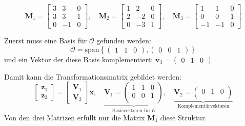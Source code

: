 \documentclass[crop=false]{standalone}
\begin{document}
\begin{task}
\begin{enumerate}[i]
\[\mathbf{M}_{1}=\left[\begin{array}{ccc}{3} & {3} & {0} \\ {3} & {3} & {1} \\ {0} & {-1} & {0}\end{array}\right], \quad \mathbf{M}_{2}=\left[\begin{array}{ccc}{1} & {2} & {0} \\ {2} & {-2} & {0} \\ {0} & {-3} & {1}\end{array}\right], \quad \mathbf{M}_{3}=\left[\begin{array}{ccc}{1} & {1} & {0} \\ {0} & {0} & {1} \\ {-1} & {-1} & {0}\end{array}\right]
 \]
 \begin{solution}
 Zuerst muss eine Basis für $\mathcal{O}$ gefunden werden:
 \[ \mathcal{O} = \text{span}\left\{ 
 \begin{pmatrix} 1 & 1 & 0 \end{pmatrix},
 \begin{pmatrix} 0 & 0 & 1 \end{pmatrix}
 \right\} \]
 und ein Vektor der diese Basis komplementiert: $\mathbf{v}_3 = \begin{pmatrix} 0 & 1 & 0 \end{pmatrix}$
 
 
 Damit kann die Transformationsmatrix gebildet werden:
 \[ 
\left[\begin{array}{l}{\mathbf{z}_{1}} \\ {\mathbf{z}_{2}}\end{array}\right]=\left[\begin{array}{c}{\mathbf{V}_{1}} \\ {\mathbf{V}_{2}}\end{array}\right] \mathbf{x}, \quad 
\underbrace{
\mathbf{V}_{1} = 
\begin{pmatrix}
1&1&0\\
0&0&1\\
\end{pmatrix}}_{\text{Basisvektoren für }\mathcal{O}}, \quad
\underbrace{
\mathbf{V}_{2} = 
\begin{pmatrix}
0&1&0\\
\end{pmatrix}}_{\text{Komplementärvektoren}}
 \]
 Von den drei Matrizen erfüllt nur die Matrix $\mathbf{M}_1$ diese Struktur.
 

\end{solution}
\end{enumerate}
\end{task}
\end{document}
